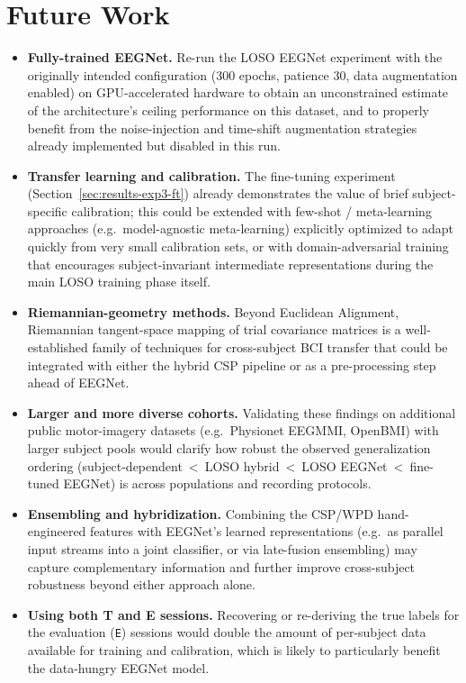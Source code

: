 \documentclass[11pt,a4paper]{article}
\begin{document}
\section{Future Work}
\label{sec:future}

\begin{itemize}[leftmargin=1.2cm]
    \item \textbf{Fully-trained EEGNet.} Re-run the LOSO EEGNet experiment with the originally
    intended configuration (300 epochs, patience 30, data augmentation enabled) on GPU-accelerated
    hardware to obtain an unconstrained estimate of the architecture's ceiling performance on this
    dataset, and to properly benefit from the noise-injection and time-shift augmentation strategies
    already implemented but disabled in this run.
    \item \textbf{Transfer learning and calibration.} The fine-tuning experiment
    (Section~\ref{sec:results-exp3-ft}) already demonstrates the value of brief subject-specific
    calibration; this could be extended with few-shot / meta-learning approaches (e.g.\
    model-agnostic meta-learning) explicitly optimized to adapt quickly from very small calibration
    sets, or with domain-adversarial training that encourages subject-invariant intermediate
    representations during the main LOSO training phase itself.
    \item \textbf{Riemannian-geometry methods.} Beyond Euclidean Alignment, Riemannian tangent-space
    mapping of trial covariance matrices is a well-established family of techniques for
    cross-subject BCI transfer that could be integrated with either the hybrid CSP pipeline or as a
    pre-processing step ahead of EEGNet.
    \item \textbf{Larger and more diverse cohorts.} Validating these findings on additional
    public motor-imagery datasets (e.g.\ Physionet EEGMMI, OpenBMI) with larger subject pools would
    clarify how robust the observed generalization ordering (subject-dependent~<~LOSO
    hybrid~<~LOSO EEGNet~<~fine-tuned EEGNet) is across populations and recording protocols.
    \item \textbf{Ensembling and hybridization.} Combining the CSP/WPD hand-engineered features with
    EEGNet's learned representations (e.g.\ as parallel input streams into a joint classifier, or via
    late-fusion ensembling) may capture complementary information and further improve cross-subject
    robustness beyond either approach alone.
    \item \textbf{Using both T and E sessions.} Recovering or re-deriving the true labels for the
    evaluation (\texttt{E}) sessions would double the amount of per-subject data available for
    training and calibration, which is likely to particularly benefit the data-hungry EEGNet model.
\end{itemize}
\end{document}

